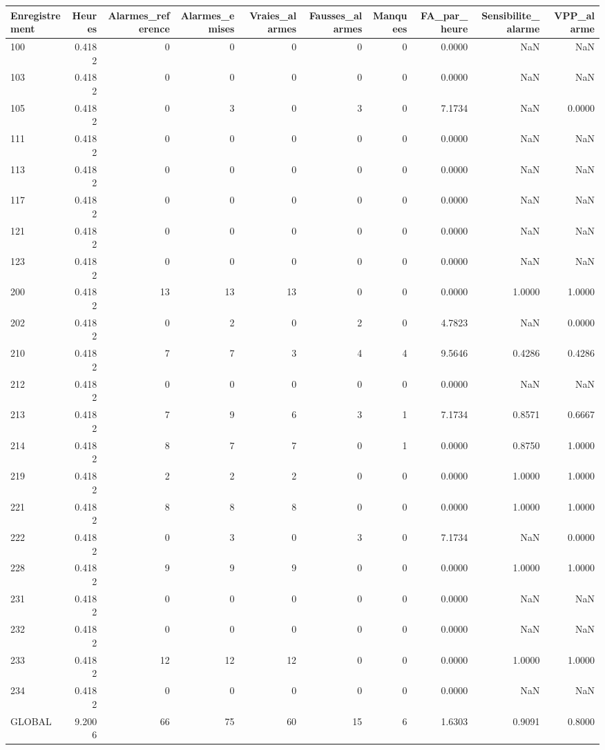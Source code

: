 \begin{tabular}{lrrrrrrrrr}
\toprule
Enregistrement & Heures & Alarmes_reference & Alarmes_emises & Vraies_alarmes & Fausses_alarmes & Manquees & FA_par_heure & Sensibilite_alarme & VPP_alarme \\
\midrule
100 & 0.4182 & 0 & 0 & 0 & 0 & 0 & 0.0000 & NaN & NaN \\
103 & 0.4182 & 0 & 0 & 0 & 0 & 0 & 0.0000 & NaN & NaN \\
105 & 0.4182 & 0 & 3 & 0 & 3 & 0 & 7.1734 & NaN & 0.0000 \\
111 & 0.4182 & 0 & 0 & 0 & 0 & 0 & 0.0000 & NaN & NaN \\
113 & 0.4182 & 0 & 0 & 0 & 0 & 0 & 0.0000 & NaN & NaN \\
117 & 0.4182 & 0 & 0 & 0 & 0 & 0 & 0.0000 & NaN & NaN \\
121 & 0.4182 & 0 & 0 & 0 & 0 & 0 & 0.0000 & NaN & NaN \\
123 & 0.4182 & 0 & 0 & 0 & 0 & 0 & 0.0000 & NaN & NaN \\
200 & 0.4182 & 13 & 13 & 13 & 0 & 0 & 0.0000 & 1.0000 & 1.0000 \\
202 & 0.4182 & 0 & 2 & 0 & 2 & 0 & 4.7823 & NaN & 0.0000 \\
210 & 0.4182 & 7 & 7 & 3 & 4 & 4 & 9.5646 & 0.4286 & 0.4286 \\
212 & 0.4182 & 0 & 0 & 0 & 0 & 0 & 0.0000 & NaN & NaN \\
213 & 0.4182 & 7 & 9 & 6 & 3 & 1 & 7.1734 & 0.8571 & 0.6667 \\
214 & 0.4182 & 8 & 7 & 7 & 0 & 1 & 0.0000 & 0.8750 & 1.0000 \\
219 & 0.4182 & 2 & 2 & 2 & 0 & 0 & 0.0000 & 1.0000 & 1.0000 \\
221 & 0.4182 & 8 & 8 & 8 & 0 & 0 & 0.0000 & 1.0000 & 1.0000 \\
222 & 0.4182 & 0 & 3 & 0 & 3 & 0 & 7.1734 & NaN & 0.0000 \\
228 & 0.4182 & 9 & 9 & 9 & 0 & 0 & 0.0000 & 1.0000 & 1.0000 \\
231 & 0.4182 & 0 & 0 & 0 & 0 & 0 & 0.0000 & NaN & NaN \\
232 & 0.4182 & 0 & 0 & 0 & 0 & 0 & 0.0000 & NaN & NaN \\
233 & 0.4182 & 12 & 12 & 12 & 0 & 0 & 0.0000 & 1.0000 & 1.0000 \\
234 & 0.4182 & 0 & 0 & 0 & 0 & 0 & 0.0000 & NaN & NaN \\
GLOBAL & 9.2006 & 66 & 75 & 60 & 15 & 6 & 1.6303 & 0.9091 & 0.8000 \\
\bottomrule
\end{tabular}

